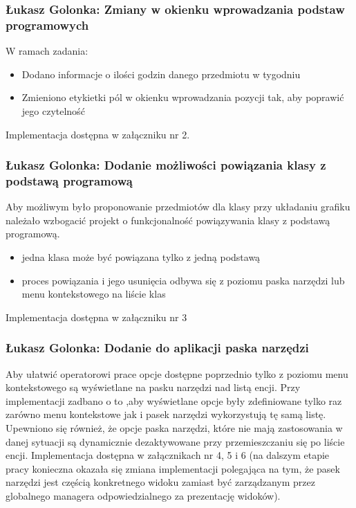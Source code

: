 \documentclass[12pt,a4paper,oneside]{article}
\theoremstyle{definition}
\numberwithin{equation}{section}
\begin{document}
\subsubsection{Łukasz Golonka: Zmiany w okienku wprowadzania podstaw programowych}
W ramach zadania:
\begin{itemize}
\item Dodano informacje o ilości godzin danego przedmiotu w tygodniu
\item Zmieniono etykietki pól w okienku wprowadzania pozycji tak, aby poprawić jego czytelność
\end{itemize}
Implementacja dostępna w załączniku nr 2.


\subsubsection{Łukasz Golonka: Dodanie możliwości powiązania klasy z podstawą programową}
Aby możliwym było proponowanie przedmiotów dla klasy przy układaniu grafiku należało wzbogacić projekt o funkcjonalność powiązywania klasy z podstawą programową.
\begin{itemize}
\item jedna klasa może być powiązana tylko z jedną podstawą
\item proces powiązania i jego usunięcia odbywa się z poziomu paska narzędzi lub menu kontekstowego na liście klas
\end{itemize}
Implementacja dostępna w załączniku nr 3

\subsubsection{Łukasz Golonka: Dodanie do aplikacji paska narzędzi}
Aby ułatwić operatorowi prace opcje dostępne poprzednio tylko z poziomu menu kontekstowego są wyświetlane na pasku narzędzi nad listą encji.
Przy implementacji zadbano o to ,aby wyświetlane opcje były  zdefiniowane tylko raz zarówno menu kontekstowe jak i pasek narzędzi wykorzystują tę samą listę.
Upewniono się również, że opcje paska narzędzi, które nie mają zastosowania w danej sytuacji są dynamicznie dezaktywowane przy przemieszczaniu się po liście encji.
Implementacja dostępna w załącznikach nr 4, 5 i 6 (na dalszym etapie pracy konieczna okazała się zmiana implementacji polegająca na tym, że pasek narzędzi jest częścią konkretnego widoku zamiast być zarządzanym przez globalnego managera odpowiedzialnego za prezentację widoków).
\end{document}
